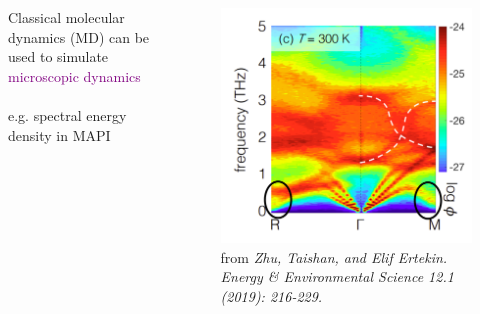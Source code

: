\documentclass[12pt]{beamer}
\begin{document}

\begin{frame} %

\begin{columns}
\begin{column}{0.5\textwidth}
    Classical molecular dynamics (MD) can be used to simulate \textcolor{purple}{microscopic dynamics} \\
    ~ \\
    e.g. spectral energy density in MAPI 
\end{column}
\begin{column}{0.5\textwidth}  
    \begin{figure}
        \includegraphics[width=1.0\linewidth]{figs/elif.png}
        \caption{from \emph{Zhu, Taishan, and Elif Ertekin. Energy \&
        Environmental Science 12.1 (2019): 216-229.}}
    \end{figure}
\end{column}
\end{columns}

\end{frame}

\end{document}
